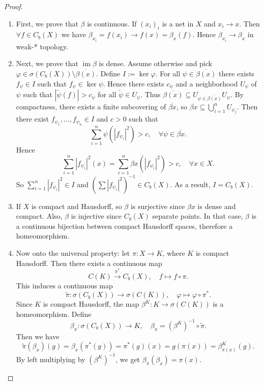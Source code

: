 \documentclass[10pt, a4paper]{article}
\newenvironment{noticeC}{%
  \tcolorbox[%
  notitle,
  empty,
  enhanced,  %
  breakable,
  coltext=black, 
  fontupper=\rmfamily,
  noparskip,
  sharp corners,
  boxrule=-1pt,  %
  frame hidden,
  left=7pt,  %
  right=7pt,
  top=5pt,
  bottom=5pt,
  before skip=2.5ex plus 2pt,
  after skip=2.5ex plus 2pt,
  overlay unbroken and last={%
  },
  ]}
{\endtcolorbox}
\newenvironment{myproof}%
  {\begin{noticeC}\begin{proof}}%
  {\end{proof}\end{noticeC}}
\DeclareMathOperator{\im}{im}
\begin{document}
\begin{myproof}
  \begin{enumerate}
    \item First, we prove that $\beta$ is continuous. If $(x_i)_i$ is a net in $X$ and $x_i \to x$.
    Then $\forall f \in C_b (X)$ we have $\beta_{x_i} = f(x_i) \to f(x) = \beta_x (f)$.
    Hence $\beta_{x_i} \to \beta_x$ in weak-* topology.
    \item Next, we prove that $\im \beta$ is dense. Assume otherwise and pick $\varphi \in \sigma(C_b (X)) \setminus \overline{\beta (x)}$.
    Define $I := \ker \varphi$. For all $\psi \in \overline{\beta (x)}$ there exists $f_{\psi} \in I$ such that $f_{\psi} \in \ker \psi$.
    Hence there exists $c_\psi$ and a neighborhood $U_{\psi}$ of $\psi$ such that $| \widetilde{\psi} (f)| > c_{\psi}$ for all $\widetilde{\psi} \in U_{\psi}$.
    Thus $\overline{\beta (x)} \subseteq U_{\psi \in \overline{\beta (x)}} U_{\psi}$.
    By compactness, there exists a finite subcovering of $\overline{\beta x}$, so $\overline{\beta x} \subseteq \bigcup_{i = 1} ^n U_{\psi_j}$.
    Then there exist $f_{\psi_1}, \dots, f_{\psi_n} \in I$ and $c > 0$ such that 
    $$\sum_{i = 1} ^n \psi (|f_{\psi_i}|^2) > c,\quad \forall \psi \in \overline{\beta x}.$$
    Hence $$\sum_{i = 1} ^n |f_{\psi_i}|^2 (x) = \sum_{i = 1} ^n \beta x (|f_{\psi_i}|^2) > c,\quad \forall x \in X.$$
    So $\sum_{i = 1} ^n |f_{\psi_i} |^2 \in I$ and $(\sum |f_{\psi_i}|^2)^{-1} \in C_b (X)$. As a result, $I = C_b (X)$.
    \item If $X$ is compact and Hausdorff, so $\beta$ is surjective since $\beta x$ is dense and compact.
    Also, $\beta$ is injective since $C_b (X)$ separate points. In that case, $\beta$ is a continuous bijection between compact Hausdorff spaces, therefore a homeomorphism.
    \item Now onto the universal property: let $\pi: X \to K$, where $K$ is compact Hausdorff.
    Then there exists a continuous map $$C(K) \xrightarrow{\pi^*} C_b (X),\quad f \mapsto f \circ \pi.$$
    This induces a continuous map 
    $$\widetilde{\pi}: \sigma(C_b (X)) \to \sigma (C(K)),\quad \varphi \mapsto \varphi \circ \pi^*.$$
    Since $K$ is compact Hausdorff, the map $\beta^K : K \to \sigma(C(K))$ is a homeomorphism.
    Define $$\beta_\pi: \sigma(C_b (X)) \to K,\quad \beta_{\pi} = (\beta^K)^{-1} \circ \widetilde{\pi}.$$
    Then we have 
    $$\widetilde{\pi} (\beta_x) (g) = \beta_x (\pi^* (g)) = \pi^* (g) (x) = g(\pi(x)) = \beta_{\pi(x)} ^K (g).$$
    By left multiplying by $(\beta^K)^{-1}$, we get $\beta_{\pi} (\beta_x) = \pi (x)$. \qedhere
  \end{enumerate}

\end{myproof}
\end{document}
